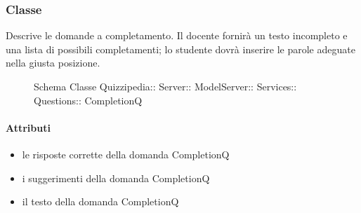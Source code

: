 \subsubsection{Classe }
Descrive le domande a completamento. Il docente fornirà un testo incompleto e una lista di possibili completamenti; lo studente dovrà inserire le parole adeguate nella giusta posizione.
\begin{figure}[H]
\centering
\noindent{}
\caption[Schema Classe CompletionQ]{Schema Classe Quizzipedia:: Server:: ModelServer:: Services:: Questions:: CompletionQ}
\end{figure}
\paragraph{Attributi}
\begin{itemize}
\item {}
\newline
le risposte corrette della domanda CompletionQ
\item {}
\newline
i suggerimenti della domanda CompletionQ
\item {}
\newline
il testo della domanda CompletionQ
\end{itemize}
